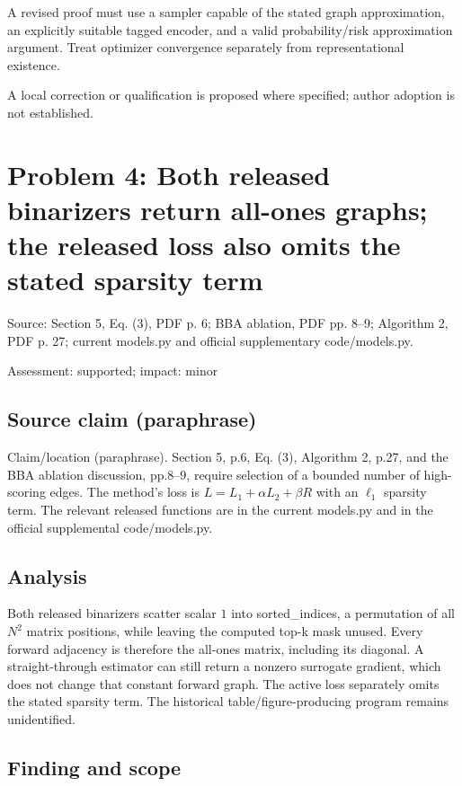 \documentclass[11pt]{article}
\begin{document}
A revised proof must use a sampler capable of the stated graph approximation, an explicitly suitable tagged encoder, and a valid probability/risk approximation argument. Treat optimizer convergence separately from representational existence.

A local correction or qualification is proposed where specified; author adoption is not established.

\section*{Problem 4: Both released binarizers return all-ones graphs; the released loss also omits the stated sparsity term}

Source: Section 5, Eq. (3), PDF p. 6; BBA ablation, PDF pp. 8–9; Algorithm 2, PDF p. 27; current models.py and official supplementary code/models.py.

Assessment: supported; impact: minor

\subsection*{Source claim (paraphrase)}

Claim/location (paraphrase). Section 5, p.6, Eq. (3), Algorithm 2, p.27, and the BBA ablation discussion, pp.8–\(9\), require selection of a bounded number of high-scoring edges. The method’s loss is \(L=L_1+\alpha L_2+\beta R\) with an \(\ell_1\) sparsity term. The relevant released functions are in the current models.py and in the official supplemental code/models.py.

\subsection*{Analysis}

Both released binarizers scatter scalar \(1\) into sorted\_indices, a permutation of all \(N^2\) matrix positions, while leaving the computed top-k mask unused. Every forward adjacency is therefore the all-ones matrix, including its diagonal. A straight-through estimator can still return a nonzero surrogate gradient, which does not change that constant forward graph. The active loss separately omits the stated sparsity term. The historical table/figure-producing program remains unidentified.

\subsection*{Finding and scope}
\end{document}
